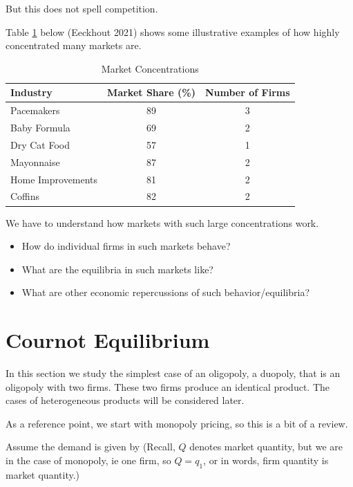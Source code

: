 \documentclass[
]{book}
\providecommand{\tightlist}{%
  \setlength{\itemsep}{0pt}\setlength{\parskip}{0pt}}
\begin{document}
But this does not spell competition.

Table \ref{tab:oligopoly1} below (Eeckhout 2021) shows some illustrative examples of how highly concentrated many markets are.

\begin{table}

\caption{\label{tab:oligopoly1}Market Concentrations}
\centering
\begin{tabular}[t]{l|c|c}
\hline
Industry & Market Share (\%) & Number of Firms\\
\hline
Pacemakers & 89 & 3\\
\hline
Baby Formula & 69 & 2\\
\hline
Dry Cat Food & 57 & 1\\
\hline
Mayonnaise & 87 & 2\\
\hline
Home Improvements & 81 & 2\\
\hline
Coffins & 82 & 2\\
\hline
\end{tabular}
\end{table}

We have to understand how markets with such large concentrations work.

\begin{itemize}
\tightlist
\item
  How do individual firms in such markets behave?
\item
  What are the equilibria in such markets like?
\item
  What are other economic repercussions of such behavior/equilibria?
\end{itemize}

\hypertarget{cournot-equilibrium}{%
\section{Cournot Equilibrium}\label{cournot-equilibrium}}

In this section we study the simplest case of an oligopoly, a duopoly, that is an oligopoly with two firms. These two firms produce an identical product. The cases of heterogeneous products will be considered later.

As a reference point, we start with monopoly pricing, so this is a bit of a review.

Assume the demand is given by (Recall, \(Q\) denotes market quantity, but we are in the case of monopoly, ie one firm, so \(Q=q_1\), or in words, firm quantity is market quantity.)
\end{document}
